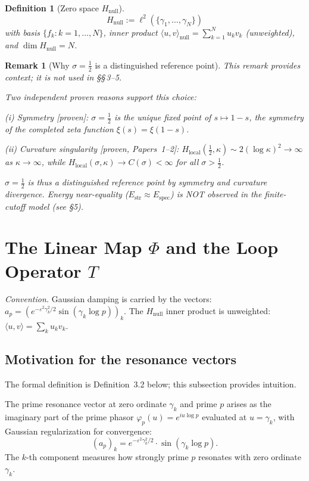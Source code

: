 \documentclass[11pt]{article}
\newtheorem{definition}[theorem]{Definition}
\newtheorem*{remark}{Remark}
\newcommand{\Hnull}{H_{\mathrm{null}}}
\newcommand{\Estr}{E_{\mathrm{str}}}
\newcommand{\Espec}{E_{\mathrm{spec}}}
\newcommand{\Hlocal}{H_{\mathrm{local}}}
\begin{document}
\begin{definition}[Zero space $\Hnull$]
\[
\Hnull := \ell^2(\{\gamma_1,\ldots,\gamma_N\})
\]
with basis $\{f_k:k=1,\ldots,N\}$, inner product
$\langle u,v\rangle_{\mathrm{null}}=\sum_{k=1}^N u_k v_k$
(unweighted), and $\dim\Hnull=N$.
\end{definition}

\begin{remark}[Why $\sigma=\tfrac12$ is a distinguished reference point]
\label{rem:half}
This remark provides context; it is not used in \S\S\,3--5.

Two independent proven reasons support this choice:

\emph{(i) Symmetry} [proven]: $\sigma=\tfrac12$ is the unique fixed point of
$s\mapsto 1-s$, the symmetry of the completed zeta function
$\xi(s)=\xi(1-s)$.

\emph{(ii) Curvature singularity} [proven, Papers~1--2]:
$\Hlocal(\tfrac12,\kappa)\sim 2(\log\kappa)^2\to\infty$ as $\kappa\to\infty$,
while $\Hlocal(\sigma,\kappa)\to C(\sigma)<\infty$ for all $\sigma>\tfrac12$.

$\sigma=\tfrac12$ is thus a distinguished reference point by symmetry and
curvature divergence. Energy near-equality ($\Estr\approx\Espec$) is NOT
observed in the finite-cutoff model (see \S5).
\end{remark}

\section{The Linear Map $\Phi$ and the Loop Operator $T$}

\emph{Convention.} Gaussian damping is carried by the vectors:
$a_p=(e^{-\varepsilon^2\gamma_k^2/2}\sin(\gamma_k\log p))_k$.
The $\Hnull$ inner product is unweighted: $\langle u,v\rangle=\sum_k u_kv_k$.

\subsection{Motivation for the resonance vectors}

The formal definition is Definition~3.2 below; this subsection
provides intuition.

The prime resonance vector at zero ordinate $\gamma_k$ and prime $p$ arises as
the imaginary part of the prime phasor $\varphi_p(u)=e^{iu\log p}$ evaluated
at $u=\gamma_k$, with Gaussian regularization for convergence:
\[
(a_p)_k = e^{-\varepsilon^2\gamma_k^2/2}\cdot\sin(\gamma_k\log p).
\]
The $k$-th component measures how strongly prime $p$ resonates with zero
ordinate $\gamma_k$.
\end{document}
